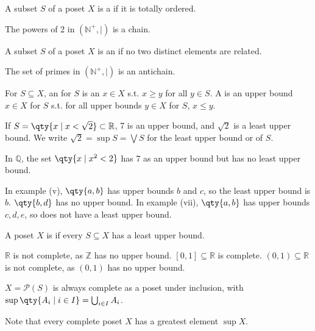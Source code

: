 \begin{definition}
    A subset $S$ of a poset $X$ is a  if it is totally ordered.
\end{definition}
\begin{example}
    The powers of 2 in $(\mathbb N^+, \mid)$ is a chain.
\end{example}
\begin{definition}
    A subset $S$ of a poset $X$ is an  if no two distinct elements are related.
\end{definition}
\begin{example}
    The set of primes in $(\mathbb N^+, \mid)$ is an antichain.
\end{example}
\begin{definition}
    For $S \subseteq X$, an  for $S$ is an $x \in X$ s.t. $x \geq y$ for all $y \in S$.
    A  is an upper bound $x \in X$ for $S$ s.t. for all upper bounds $y \in X$ for $S$, $x \leq y$.
\end{definition}
\begin{example}
    If $S = \qty{x \mid x < \sqrt{2}} \subset \mathbb R$, 7 is an upper bound, and $\sqrt{2}$ is a least upper bound.
    We write $\sqrt{2} = \sup S = \bigvee S$ for the least upper bound or  of $S$.

    In $\mathbb Q$, the set $\qty{x \mid x^2 < 2}$ has 7 as an upper bound but has no least upper bound.

    In example (v), $\qty{a, b}$ has upper bounds $b$ and $c$, so the least upper bound is $b$.
    $\qty{b, d}$ has no upper bound.
    In example (vii), $\qty{a, b}$ has upper bounds $c, d, e$, so does not have a least upper bound.
\end{example}
\begin{definition}
    A poset $X$ is  if every $S \subseteq X$ has a least upper bound.
\end{definition}
\begin{example}
    $\mathbb R$ is not complete, as $\mathbb Z$ has no upper bound.
    $[0,1] \subseteq \mathbb R$ is complete.
    $(0,1) \subseteq \mathbb R$ is not complete, as $(0,1)$ has no upper bound.
\end{example}
\begin{example}
    $X = \mathcal P(S)$ is always complete as a poset under inclusion, with $\sup\qty{A_i \mid i \in I} = \bigcup_{i \in I} A_i$.
\end{example}
Note that every complete poset $X$ has a greatest element $\sup X$.

